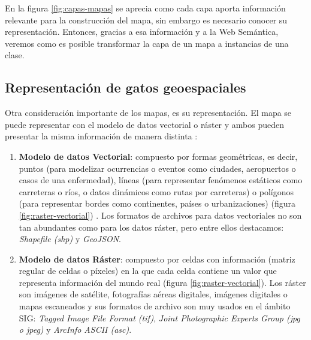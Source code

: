 En la figura \ref{fig:capas-mapas} se aprecia como cada capa aporta información relevante para la construcción del mapa, sin embargo es necesario conocer su representación. Entonces, gracias a esa información y a la Web Semántica, veremos como es posible transformar la capa de un mapa a instancias de una clase.

\subsection{Representación de gatos geoespaciales}


Otra consideración importante de los mapas, es su representación. El mapa se puede representar con el modelo de datos vectorial o ráster y ambos pueden presentar la misma información de manera distinta \cite{tipos-datos-sig}:

\begin{enumerate}
	\item \textbf{Modelo de datos Vectorial}: compuesto por formas geométricas, es decir, puntos (para modelizar ocurrencias o eventos como ciudades, aeropuertos o casos de una enfermedad), líneas (para representar fenómenos estáticos como carreteras o ríos, o datos dinámicos como rutas por carreteras) o polígonos (para representar bordes como continentes, países o urbanizaciones) (figura \ref{fig:raster-vectorial}) \cite{AsignaturaSIG}. Los formatos de archivos para datos vectoriales no son tan abundantes como para los datos ráster, pero entre ellos destacamos: \textit{Shapefile (shp)} y \textit{GeoJSON}.
	
	\item \textbf{Modelo de datos Ráster}: compuesto por celdas con información (matriz regular de celdas o píxeles) en la que cada celda contiene un valor que representa información del mundo real (figura \ref{fig:raster-vectorial}). Los ráster son imágenes de satélite, fotografías aéreas digitales, imágenes digitales o mapas escaneados \cite{raster} y sus formatos de archivo son muy usados en el ámbito SIG: \textit{Tagged Image File Format (tif)}, \textit{Joint Photographic Experts Group (jpg o jpeg)} y \textit{ArcInfo ASCII (asc)}.
	
	
	
\end{enumerate}



